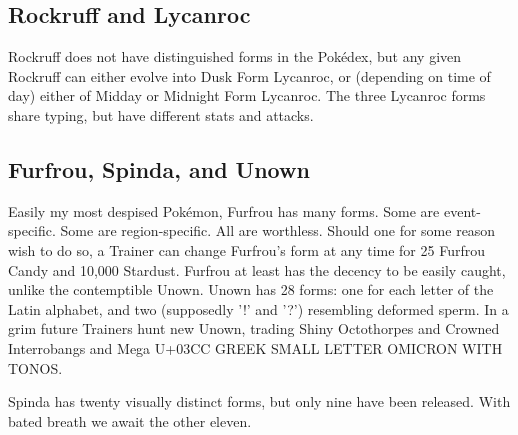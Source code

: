 \subsection{Rockruff and Lycanroc\label{subsec:rockruff}}
Rockruff does not have distinguished forms in the Pokédex, but any given Rockruff
 can either evolve into Dusk Form Lycanroc, or (depending on time of day)
 either of Midday or Midnight Form Lycanroc.
The three Lycanroc forms share typing, but have different stats and attacks.

\subsection{Furfrou, Spinda, and Unown\label{subsec:furfrou}}
Easily my most despised Pokémon, Furfrou has many forms.
Some are event-specific.
Some are region-specific.
All are worthless.
Should one for some reason wish to do so, a Trainer can change Furfrou's form
  at any time for 25 Furfrou Candy and 10,000 Stardust.
Furfrou at least has the decency to be easily caught, unlike the contemptible Unown.
Unown has 28 forms: one for each letter of the Latin alphabet, and two
  (supposedly '!' and '?') resembling deformed sperm.
In a grim future Trainers hunt new Unown, trading Shiny Octothorpes and
  Crowned Interrobangs and Mega U+03CC GREEK SMALL LETTER OMICRON WITH TONOS.

Spinda has twenty visually distinct forms, but only nine have been released.
With bated breath we await the other eleven.
